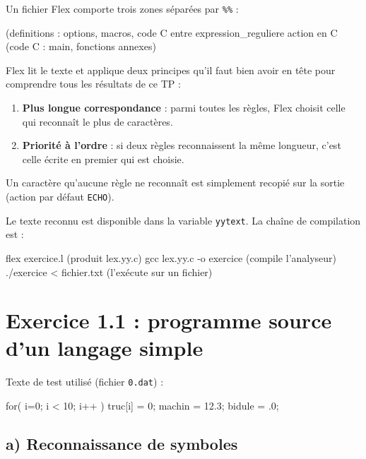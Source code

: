 \documentclass[11pt,a4paper]{article}
\begin{document}
Un fichier Flex comporte trois zones séparées par \texttt{\%\%} :

\begin{code}
(definitions : options, macros, code C entre %
expression_reguliere     { action en C }
(code C : main, fonctions annexes)
\end{code}

Flex lit le texte et applique deux principes qu'il faut bien avoir en tête pour comprendre
tous les résultats de ce TP :

\begin{idee}
\begin{enumerate}[leftmargin=1.5em,nosep]
  \item \textbf{Plus longue correspondance} : parmi toutes les règles, Flex choisit celle qui reconnaît le plus de caractères.
  \item \textbf{Priorité à l'ordre} : si deux règles reconnaissent la même longueur, c'est celle écrite en premier qui est choisie.
\end{enumerate}
Un caractère qu'aucune règle ne reconnaît est simplement recopié sur la sortie (action par défaut \texttt{ECHO}).
\end{idee}

Le texte reconnu est disponible dans la variable \texttt{yytext}. La chaîne de compilation est :

\begin{code}
flex exercice.l            (produit lex.yy.c)
gcc lex.yy.c -o exercice   (compile l'analyseur)
./exercice < fichier.txt   (l'exécute sur un fichier)
\end{code}

\section{Exercice 1.1 : programme source d'un langage simple}

Texte de test utilisé (fichier \texttt{0.dat}) :
\begin{code}
for( i=0; i < 10; i++ ) {
  truc[i] = 0;
  machin = 12.3;
  bidule = .0;
}
\end{code}

\subsection{a) Reconnaissance de symboles}
\end{document}
